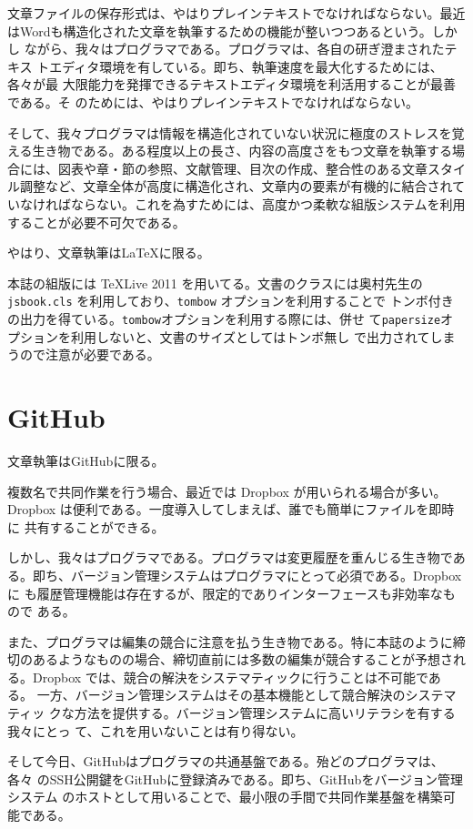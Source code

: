 文章ファイルの保存形式は、やはりプレインテキストでなければならない。最近
はWordも構造化された文章を執筆するための機能が整いつつあるという。しかし
ながら、我々はプログラマである。プログラマは、各自の研ぎ澄まされたテキス
トエディタ環境を有している。即ち、執筆速度を最大化するためには、各々が最
大限能力を発揮できるテキストエディタ環境を利活用することが最善である。そ
のためには、やはりプレインテキストでなければならない。

そして、我々プログラマは情報を構造化されていない状況に極度のストレスを覚
える生き物である。ある程度以上の長さ、内容の高度さをもつ文章を執筆する場
合には、図表や章・節の参照、文献管理、目次の作成、整合性のある文章スタイ
ル調整など、文章全体が高度に構造化され、文章内の要素が有機的に結合されて
いなければならない。これを為すためには、高度かつ柔軟な組版システムを利用
することが必要不可欠である。

やはり、文章執筆はLaTeXに限る。

本誌の組版には \TeX Live 2011 を用いてる。文書のクラスには奥村先生の
{\tt jsbook.cls} を利用しており、{\tt tombow} オプションを利用することで
トンボ付きの出力を得ている。{\tt tombow}オプションを利用する際には、併せ
て{\tt papersize}オプションを利用しないと、文書のサイズとしてはトンボ無し
で出力されてしまうので注意が必要である。

\section{GitHub}

文章執筆はGitHubに限る。

複数名で共同作業を行う場合、最近では Dropbox が用いられる場合が多い。
Dropbox は便利である。一度導入してしまえば、誰でも簡単にファイルを即時に
共有することができる。

しかし、我々はプログラマである。プログラマは変更履歴を重んじる生き物であ
る。即ち、バージョン管理システムはプログラマにとって必須である。Dropboxに
も履歴管理機能は存在するが、限定的でありインターフェースも非効率なもので
ある。

また、プログラマは編集の競合に注意を払う生き物である。特に本誌のように締
切のあるようなものの場合、締切直前には多数の編集が競合することが予想され
る。Dropbox では、競合の解決をシステマティックに行うことは不可能である。
一方、バージョン管理システムはその基本機能として競合解決のシステマティッ
クな方法を提供する。バージョン管理システムに高いリテラシを有する我々にとっ
て、これを用いないことは有り得ない。

そして今日、GitHubはプログラマの共通基盤である。殆どのプログラマは、各々
のSSH公開鍵をGitHubに登録済みである。即ち、GitHubをバージョン管理システム
のホストとして用いることで、最小限の手間で共同作業基盤を構築可能である。

